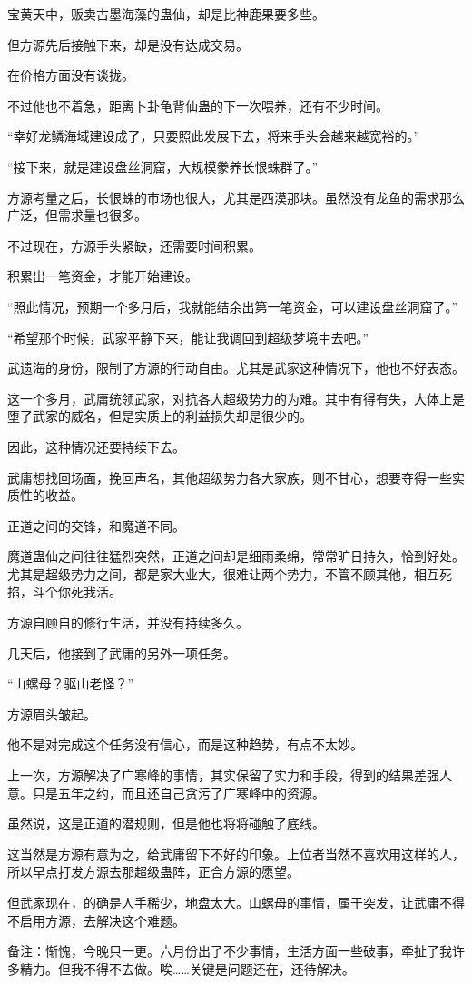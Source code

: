 \begin{this_body}
宝黄天中，贩卖古墨海藻的蛊仙，却是比神鹿果要多些。

但方源先后接触下来，却是没有达成交易。

在价格方面没有谈拢。

不过他也不着急，距离卜卦龟背仙蛊的下一次喂养，还有不少时间。

“幸好龙鳞海域建设成了，只要照此发展下去，将来手头会越来越宽裕的。”

“接下来，就是建设盘丝洞窟，大规模豢养长恨蛛群了。”

方源考量之后，长恨蛛的市场也很大，尤其是西漠那块。虽然没有龙鱼的需求那么广泛，但需求量也很多。

不过现在，方源手头紧缺，还需要时间积累。

积累出一笔资金，才能开始建设。

“照此情况，预期一个多月后，我就能结余出第一笔资金，可以建设盘丝洞窟了。”

“希望那个时候，武家平静下来，能让我调回到超级梦境中去吧。”

武遗海的身份，限制了方源的行动自由。尤其是武家这种情况下，他也不好表态。

这一个多月，武庸统领武家，对抗各大超级势力的为难。其中有得有失，大体上是堕了武家的威名，但是实质上的利益损失却是很少的。

因此，这种情况还要持续下去。

武庸想找回场面，挽回声名，其他超级势力各大家族，则不甘心，想要夺得一些实质性的收益。

正道之间的交锋，和魔道不同。

魔道蛊仙之间往往猛烈突然，正道之间却是细雨柔绵，常常旷日持久，恰到好处。尤其是超级势力之间，都是家大业大，很难让两个势力，不管不顾其他，相互死掐，斗个你死我活。

方源自顾自的修行生活，并没有持续多久。

几天后，他接到了武庸的另外一项任务。

“山螺母？驱山老怪？”

方源眉头皱起。

他不是对完成这个任务没有信心，而是这种趋势，有点不太妙。

上一次，方源解决了广寒峰的事情，其实保留了实力和手段，得到的结果差强人意。只是五年之约，而且还自己贪污了广寒峰中的资源。

虽然说，这是正道的潜规则，但是他也将将碰触了底线。

这当然是方源有意为之，给武庸留下不好的印象。上位者当然不喜欢用这样的人，所以早点打发方源去那超级蛊阵，正合方源的愿望。

但武家现在，的确是人手稀少，地盘太大。山螺母的事情，属于突发，让武庸不得不启用方源，去解决这个难题。

备注：惭愧，今晚只一更。六月份出了不少事情，生活方面一些破事，牵扯了我许多精力。但我不得不去做。唉……关键是问题还在，还待解决。

\end{this_body}

